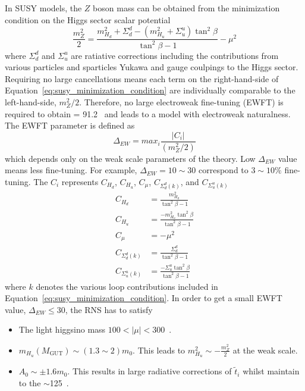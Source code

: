 In SUSY models, the $Z$ boson mass can be obtained from the minimization condition on the Higgs sector scalar potential
%
\begin{equation}
    \frac{m_{Z}^{2}}{2} = \frac{m^{2}_{H_{d}} + \Sigma^{d}_{d} - (m^{2}_{H_{u}} + \Sigma^{u}_{u})\tan^{2}\beta      }{\tan^{2}\beta - 1} - \mu^{2}
    \label{eq:susy_minimization_condition}
\end{equation}
%
where $\Sigma^{d}_{d}$ and $\Sigma^{u}_{u}$ are ratiative corrections including the contributions from various particles and sparticles Yukawa and gauge coulpings to the Higgs sector.
Requiring no large cancellations means each term on the right-hand-side of Equation~\ref{eq:susy_minimization_condition} are individually comparable to the left-hand-side, $m_{Z}^{2}/2$.
Therefore, no large electroweak fine-tuning (EWFT) is required to obtain \mZ = 91.2~{\GeV} and leads to a model with electroweak naturalness.
The EWFT parameter is defined as
%
\begin{equation}
    \Delta_{EW} =  max_{i} \frac{|C_{i}|}{(m_{Z}^{2}/2)} 
    \label{eq:susy_ewft}
\end{equation}
%
which depends only on the weak scale parameters of the theory.
Low $\Delta_{EW}$ value means less fine-tuning.
For example, $\Delta_{EW} = 10 \sim 30$ correspond to $3 \sim 10 \%$ fine-tuning.
The $C_{i}$ represents $C_{H_{d}}$, $C_{H_{u}}$, $C_{\mu}$, $C_{\Sigma^{d}_{d}(k)}$, and $C_{\Sigma^{u}_{u}(k)}$
%
\begin{align}
    C_{H_{d}} &= \frac{m^{2}_{H_{d}}}{\tan^{2}\beta - 1}\\
    C_{H_{u}} &= \frac{-m^{2}_{H_{u}}\tan^{2}\beta}{\tan^{2}\beta - 1}\\
    C_{\mu} &= -\mu^{2}\\
    C_{\Sigma^{d}_{d}(k)} &= \frac{\Sigma^{d}_{d}}{\tan^{2}\beta - 1}\\
    C_{\Sigma^{u}_{u}(k)} &= \frac{-\Sigma^{u}_{u}\tan^{2}\beta}{\tan^{2}\beta - 1}
    \label{eq:susy_ci}
\end{align}
% 
where $k$ denotes the various loop contributions included in Equation~\ref{eq:susy_minimization_condition}.
In order to get a small EWFT value, $\Delta_{EW} \leq 30$, the RNS has to satisfy
%
\begin{itemize}
    \item The light higgsino mass $100 < |\mu| < 300$~{\GeV}. 
    \item $m_{H_{u}}(M_{\text{GUT}}) \sim (1.3 \sim 2) m_{0}$. This leads to $m^{2}_{H_{u}} \sim - \frac{m^{2}_{Z}}{2}$ at the weak scale.
    \item $A_{0} \sim \pm 1.6 m_{0}$. This results in large radiative corrections of $\widetilde{t}_{i}$ whilst maintain \mh to the $\sim$125~{\GeV}.
\end{itemize}
